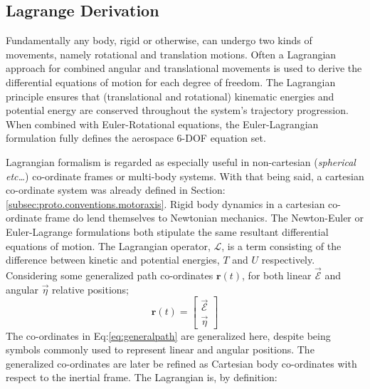 \subsection{Lagrange Derivation}
\label{subsec:dynamics.rigidbody.lagrange}
Fundamentally any body, rigid or otherwise, can undergo two kinds of movements, namely rotational and translation motions. Often a Lagrangian\cite{classicaldynamics,rotationrigidbody} approach for combined angular and translational movements is used to derive the differential equations of motion for each degree of freedom. The Lagrangian principle ensures that (translational and rotational) kinematic energies and potential energy are conserved throughout the system's trajectory progression. When combined with Euler-Rotational equations, the Euler-Lagrangian\cite{lagrange-formalism} formulation fully defines the aerospace 6-DOF equation set.
\par
Lagrangian formalism is regarded as especially useful in non-cartesian (\emph{spherical etc\ldots}) co-ordinate frames or multi-body systems. With that being said, a cartesian co-ordinate system was already defined in Section:\ref{subsec:proto.conventions.motoraxis}. Rigid body dynamics in a cartesian co-ordinate frame do lend themselves to Newtonian mechanics. The Newton-Euler or Euler-Lagrange formulations both stipulate the same resultant differential equations of motion. The Lagrangian operator, $\mathcal{L}$, is a term consisting of the difference between kinetic and potential energies, $T$ and $U$ respectively. Considering some generalized path co-ordinates $\mathbf{r}(t)$, for both linear $\vec{\mathcal{E}}$ and angular $\vec{\eta}$ relative positions;
\begin{equation}\label{eq:generalpath}
\mathbf{r}(t)=\begin{bmatrix}
\vec{\mathcal{E}} \\
\vec{\eta}
\end{bmatrix}
\end{equation}
The co-ordinates in Eq:\ref{eq:generalpath} are generalized here, despite being symbols commonly used to represent linear and angular positions. The generalized co-ordinates are later be refined as Cartesian body co-ordinates with respect to the inertial frame. The Lagrangian is, by definition:
